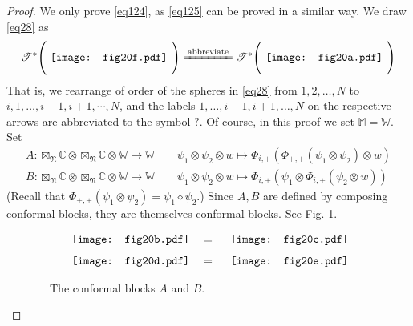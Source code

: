\documentclass[11pt,b5paper,notitlepage]{article}
\theoremstyle{definition}
\theoremstyle{plain}
\newcommand{\Wbb}{\mathbb W}
\newcommand{\Mbb}{\mathbb M}
\newcommand{\Cbb}{\mathbb C}
\newcommand{\<}{\left\langle}
\renewcommand{\>}{\right\rangle}
\newcommand{\ST}{\mathscr{T}}
\newcommand{\fn}{\mathfrak{N}}
\numberwithin{equation}{section}
\begin{document}
\begin{proof}
We only prove \eqref{eq124}, as \eqref{eq125} can be proved in a similar way. We draw \eqref{eq28} as
\begin{align}
\ST^*\Bigg(\vcenter{\hbox{{
			\texttt{[image: fig20f.pdf]}}}}~\Bigg)\xlongequal{\text{abbreviate}}\ST^*\Bigg(\vcenter{\hbox{{
			\texttt{[image: fig20a.pdf]}}}}~\Bigg)
\end{align}
That is, we rearrange of order of the spheres in \eqref{eq28} from $1,2,\dots,N$ to $i,1,\dots,i-1,i+1,\cdots,N$, and the labels $1,\dots,i-1,i+1,\dots,N$ on the respective arrows are abbreviated to the symbol $?$. Of course, in this proof we set $\Mbb=\Wbb$. Set 
\begin{gather*}
A:\boxtimes_\fn\Cbb\otimes \boxtimes_\fn\Cbb\otimes \Wbb\rightarrow \Wbb\qquad \psi_1\otimes\psi_2\otimes w\mapsto \Phi_{i,+}(\Phi_{+,+}(\psi_1\otimes\psi_2)\otimes w)\\
B:\boxtimes_\fn\Cbb\otimes \boxtimes_\fn\Cbb\otimes \Wbb\rightarrow \Wbb\qquad  \psi_1\otimes\psi_2\otimes w \mapsto \Phi_{i,+}(\psi_1\otimes \Phi_{i,+}(\psi_2\otimes w))
\end{gather*}
(Recall that $\Phi_{+,+}(\psi_1\otimes\psi_2)=\psi_1\diamond\psi_2$.) Since $A,B$ are defined by composing conformal blocks, they are themselves conformal blocks. See Fig. \ref{img3}.
\begin{figure}[h]
	\centering
\begin{gather*}
\vcenter{\hbox{{
		   \texttt{[image: fig20b.pdf]}}}}	\quad=\quad\vcenter{\hbox{{
		\texttt{[image: fig20c.pdf]}}}}\\[1ex]
\vcenter{\hbox{{
		   \texttt{[image: fig20d.pdf]}}}}	\quad=\quad	  \vcenter{\hbox{{
		\texttt{[image: fig20e.pdf]}}}}
   \end{gather*}
\caption{~~The conformal blocks $A$ and $B$.}
	\label{img3}
\end{figure}



\end{proof}
\end{document}
